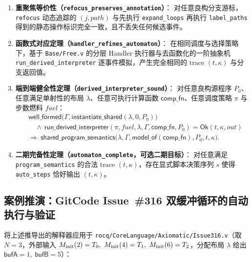 \documentclass[UTF8,a4paper,11pt,fontset=fandol]{ctexart}
\newcommand{\code}[1]{\texttt{#1}}
\newcommand{\kw}[1]{\mathsf{#1}}
\begin{document}
\begin{enumerate}
\item \textbf{重聚焦等价性（\code{refocus\_preserves\_annotation}）}：
  对任意良构分支游标，\code{refocus} 动态追踪的 $(j, \mathit{path})$ 与先执行 \code{expand\_loops} 再执行 \code{label\_paths} 得到的静态操作标识完全一致，且不丢失任何候选事件。
\item \textbf{函数式对应定理（\code{handler\_refines\_automaton}）}：
  在相同调度与选择策略下，基于 \code{Base/Free.v} 的分层 Handler 执行器与去函数化的一阶抽象机 \code{run\_derived\_interpreter} 逐事件模拟，产生完全相同的 trace $(t, \kappa)$ 与分支返回值。
\item \textbf{端到端健全性定理（\code{derived\_interpreter\_sound}）}：
  对任意良构源程序 $P_0$、任意满足单射性的布局 $\lambda$、任意可执行计算函数 $\mathsf{comp\_fn}$、任意调度策略 $\pi$ 与步数燃料 $\mathit{fuel}$：
  \[
  \begin{aligned}
  &\kw{well\_formed}\bigl(\Gamma, \kw{instantiate\_shared}(\lambda, 0, P_0)\bigr) \\
  &\quad\land\ \kw{run\_derived\_interpreter}(\pi, \mathit{fuel}, \lambda, \Gamma, \mathsf{comp\_fn}, P_0) = \kw{Ok}(t, \kappa, \mathit{out}) \\
  &\Longrightarrow\
  \kw{shared\_program\_semantics}\bigl(\lambda, \Gamma, \kw{model\_of}(\mathsf{comp\_fn}), P_0, t, \kappa\bigr).
  \end{aligned}
  \]
\item \textbf{二期完备性定理（\code{automaton\_complete}，可选二期目标）}：
  对任意满足 \code{program\_semantics} 的合法 trace $(t, \kappa)$，存在显式脚本决策序列 $s$ 使得 \code{auto\_steps} 恰好输出 $(t, \kappa)$。
\end{enumerate}

\subsection{案例推演：GitCode Issue~\#316 双缓冲循环的自动执行与验证}

将上述推导出的解释器应用于 \code{rocq/CoreLanguage/Axiomatic/Issue316.v}（取 $N=3$，外部输入 $M_{\rm init}(2)=T_0,\ M_{\rm init}(4)=T_1,\ M_{\rm init}(6)=T_2$，分配布局 $\lambda$ 给出 $\kw{bufA}=1,\ \kw{bufB}=5$）：
\end{document}
